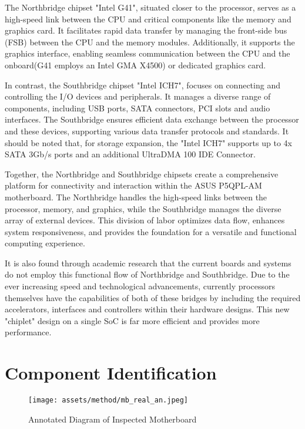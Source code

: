 The Northbridge chipset "Intel G41", situated closer to the processor, serves as a high-speed link between the CPU and critical components like the memory and graphics card. It facilitates rapid data transfer by managing the front-side bus (FSB) between the CPU and the memory modules. Additionally, it supports the graphics interface, enabling seamless communication between the CPU and the onboard(G41 employs an Intel GMA X4500) or dedicated graphics card.

In contrast, the Southbridge chipset "Intel ICH7", focuses on connecting and controlling the I/O devices and peripherals. It manages a diverse range of components, including USB ports, SATA connectors, PCI slots and audio interfaces. The Southbridge ensures efficient data exchange between the processor and these devices, supporting various data transfer protocols and standards. It should be noted that, for storage expansion, the "Intel ICH7" supports up to 4x SATA 3Gb/s ports and an additional UltraDMA 100 IDE Connector.

Together, the Northbridge and Southbridge chipsets create a comprehensive platform for connectivity and interaction within the ASUS P5QPL-AM motherboard. The Northbridge handles the high-speed links between the processor, memory, and graphics, while the Southbridge manages the diverse array of external devices. This division of labor optimizes data flow, enhances system responsiveness, and provides the foundation for a versatile and functional computing experience.

It is also found through academic research that the current boards and systems do not employ this functional flow of Northbridge and Southbridge. Due to the ever increasing speed and technological advancements, currently processors themselves have the capabilities of both of these bridges by including the required accelerators, interfaces and controllers within their hardware designs. This new "chiplet" design on a single SoC is far more efficient and provides more performance.

\section{Component Identification}
\begin{figure}[H]
\centering
\texttt{[image: assets/method/mb\_real\_an.jpeg]}
\caption{Annotated Diagram of Inspected Motherboard}
\label{fig:using:mbdissected}
\end{figure}

